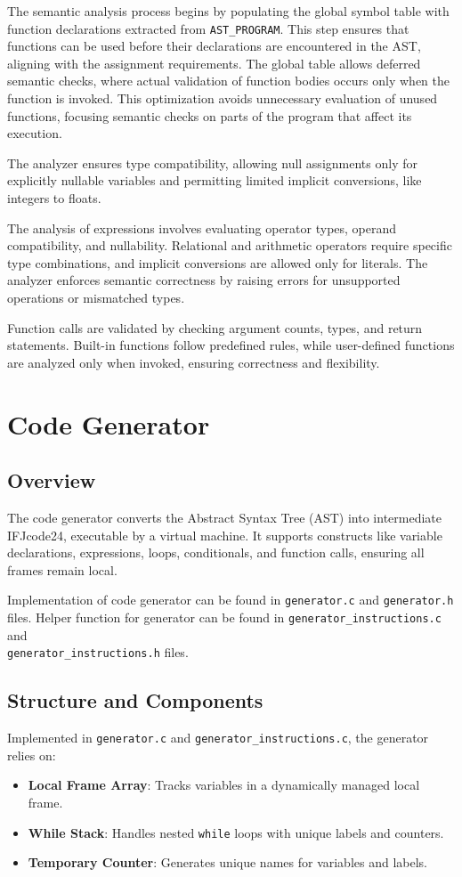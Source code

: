 \documentclass[12pt,a4paper]{article}
\begin{document}
The semantic analysis process begins by populating the global symbol table with function declarations extracted from \texttt{AST\_PROGRAM}. This step ensures that functions can be used before their declarations are encountered in the AST, aligning with the assignment requirements. The global table allows deferred semantic checks, where actual validation of function bodies occurs only when the function is invoked. This optimization avoids unnecessary evaluation of unused functions, focusing semantic checks on parts of the program that affect its execution.

The analyzer ensures type compatibility, allowing null assignments only for explicitly nullable variables and permitting limited implicit conversions, like integers to floats.

The analysis of expressions involves evaluating operator types, operand compatibility, and nullability. Relational and arithmetic operators require specific type combinations, and implicit conversions are allowed only for literals. The analyzer enforces semantic correctness by raising errors for unsupported operations or mismatched types.

Function calls are validated by checking argument counts, types, and return statements. Built-in functions follow predefined rules, while user-defined functions are analyzed only when invoked, ensuring correctness and flexibility.


\newpage
\section{Code Generator}

\subsection{Overview}
The code generator converts the Abstract Syntax Tree (AST) into intermediate IFJcode24, executable by a virtual machine. It supports constructs like variable declarations, expressions, loops, conditionals, and function calls, ensuring all frames remain local.

Implementation of code generator can be found in \texttt{generator.c} and \texttt{generator.h} files. Helper function for generator can be found in \texttt{generator\_instructions.c} and \\
\texttt{generator\_instructions.h} files.

\subsection{Structure and Components}
Implemented in \texttt{generator.c} and \texttt{generator\_instructions.c}, the generator relies on:
\begin{itemize}
    \item \textbf{Local Frame Array}: Tracks variables in a dynamically managed local frame.
    \item \textbf{While Stack}: Handles nested \texttt{while} loops with unique labels and counters.
    \item \textbf{Temporary Counter}: Generates unique names for variables and labels.
\end{itemize}
\end{document}
